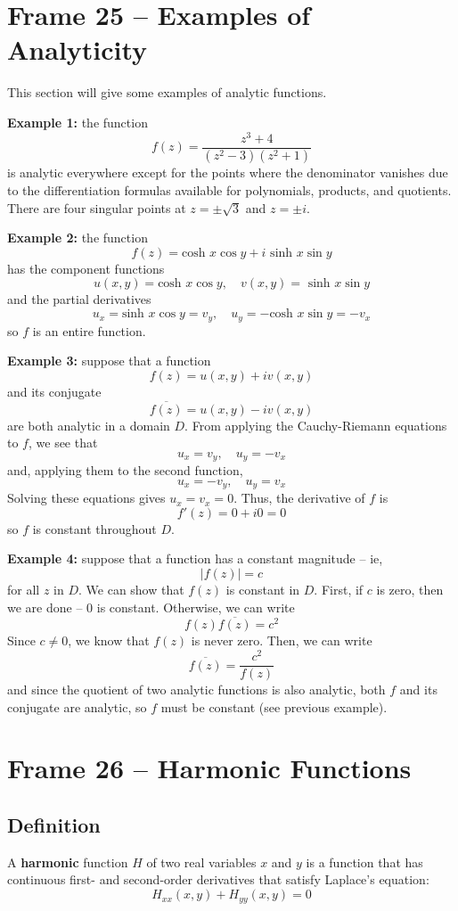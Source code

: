 \documentclass{article}
\renewcommand{\emph}{\textbf}
\renewcommand{\bar}{\overline}
\begin{document}
\clearpage
\section{Frame 25 -- Examples of Analyticity}
This section will give some examples of analytic functions.

\emph{Example 1:} the function
\[
	f(z) = \frac{z^3 + 4}{(z^2 - 3)(z^2 + 1)}
\]
is analytic everywhere except for the points where the denominator vanishes due to the differentiation formulas available for polynomials, products, and quotients. There are four singular points at $z = \pm \sqrt{3}$ and $z = \pm i$.

\emph{Example 2:} the function
\[
	f(z) = \text{cosh } x \cos y + i \text{ sinh } x \sin y
\]
has the component functions
\[
	u(x, y) = \text{cosh } x \cos y,	\quad	v(x, y) = \text{ sinh } x \sin y
\]
and the partial derivatives
\[
	u_x = \text{sinh } x \cos y = v_y,	\quad
	u_y = -\text{cosh } x \sin y = -v_x	
\]
so $f$ is an entire function.

\emph{Example 3:} suppose that a function
\[
	f(z) = u(x, y) + iv(x, y)
\]
and its conjugate
\[
	\bar{f(z)} = u(x, y) - iv(x, y)
\]
are both analytic in a domain $D$. From applying the Cauchy-Riemann equations to $f$, we see that
\[
	u_x = v_y,	\quad u_y = -v_x
\]
and, applying them to the second function,
\[
	u_x = -v_y,	\quad u_y = v_x
\]
Solving these equations gives $u_x = v_x = 0$. Thus, the derivative of $f$ is
\[
	f'(z) = 0 + i0 = 0
\]
so $f$ is constant throughout $D$.

\emph{Example 4:} suppose that a function has a constant magnitude -- ie,
\[
	|f(z)| = c
\]
for all $z$ in $D$. We can show that $f(z)$ is constant in $D$. First, if $c$ is zero, then we are done -- $0$ is constant. Otherwise, we can write
\[
	f(z) \bar{f(z)} = c^2
\]
Since $c \neq 0$, we know that $f(z)$ is never zero. Then, we can write
\[
	\bar{f(z)} = \frac{c^2}{f(z)}
\]
and since the quotient of two analytic functions is also analytic, both $f$ and its conjugate are analytic, so $f$ must be constant (see previous example).


\clearpage
\section{Frame 26 -- Harmonic Functions}
\subsection{Definition}
A \emph{harmonic} function $H$ of two real variables $x$ and $y$ is a function that has continuous first- and second-order derivatives that satisfy Laplace's equation:
\[
	H_{xx}(x, y) + H_{yy}(x, y) = 0
\]
\end{document}

